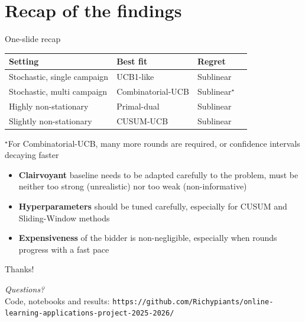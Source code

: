﻿\section{Recap of the findings}

\begin{frame}{One-slide recap}
    \begin{table}[t]
        \centering
        \small
        \begin{tabular}{l l l l}
            \toprule
            \textbf{Setting} & \textbf{Best fit} & \textbf{Regret} \\
            \midrule
            Stochastic, single campaign & UCB1-like & Sublinear \\
            Stochastic, multi campaign & Combinatorial-UCB & Sublinear$^\star$ \\
            Highly non-stationary      & Primal-dual        & Sublinear \\
            Slightly non-stationary    & CUSUM-UCB          & Sublinear \\
            \bottomrule
        \end{tabular}
    \end{table}
    \centering\scriptsize{$^\star$For Combinatorial-UCB, many more rounds are required, or confidence intervals decaying faster}
    
    \vspace{0.2cm}

    \small\begin{itemize}
        \item \textbf{Clairvoyant} baseline needs to be adapted carefully to the problem, must be neither too strong (unrealistic) nor too weak (non-informative)
        \item \textbf{Hyperparameters} should be tuned carefully, especially for CUSUM and Sliding-Window methods
        \item \textbf{Expensiveness} of the bidder is non-negligible, especially when rounds progress with a fast pace
    \end{itemize}
\end{frame}

\begin{frame}{Thanks!}
    \begin{center}
        \Large
        \emph{Questions?} \\
        \vspace{5mm}
        Code, notebooks and results:   
        \vspace{1cm}
        \small \texttt{https://github.com/Richypiants/online-learning-applications-project-2025-2026/}
    \end{center}
\end{frame}